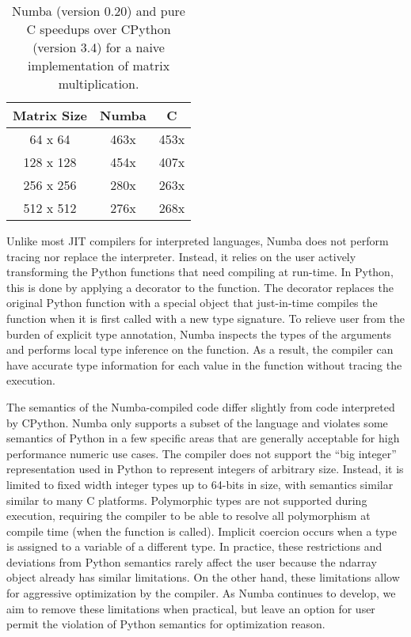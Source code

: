 \documentclass{acm_proc_article-sp}
\begin{document}
\begin{table}
\centering
\label{table:speedup}
\caption{Numba (version 0.20) and pure C speedups over CPython (version 3.4) for a naive implementation of matrix multiplication.}
\begin{tabular}{|c|c|c|} \hline
\textbf{Matrix Size} & \textbf{Numba} & \textbf{C}\\ \hline
64 x 64 & 463x & 453x \\ \hline
128 x 128 & 454x & 407x \\ \hline
256 x 256 & 280x & 263x \\ \hline
512 x 512 & 276x & 268x \\ \hline
\end{tabular}
\end{table}



Unlike most JIT compilers for interpreted languages, Numba does not
perform tracing nor replace the interpreter.  Instead, it relies on
the user actively transforming the Python functions that need
compiling at run-time.  In Python, this is done by applying a decorator
to the function.  The decorator replaces the original Python function
with a special object that just-in-time compiles the function when it
is first called with a new type signature.  To relieve user from the
burden of explicit type annotation, Numba inspects the types of the
arguments and performs local type inference on the function.  As a
result, the compiler can have accurate type information for each value
in the function without tracing the execution.

The semantics of the Numba-compiled code differ slightly from code
interpreted by CPython. Numba only supports a subset of the language
and violates some semantics of Python in a few specific areas that are
generally acceptable for high performance numeric use cases.  The
compiler does not support the ``big integer'' representation used in
Python to represent integers of arbitrary size.  Instead, it is
limited to fixed width integer types up to 64-bits in size, with
semantics similar similar to many C platforms.  Polymorphic types are
not supported during execution, requiring the compiler to be able to
resolve all polymorphism at compile time (when the function is
called).  Implicit coercion occurs when a type is assigned to a
variable of a different type. In practice, these restrictions and
deviations from Python semantics rarely affect the user because the
ndarray object already has similar limitations. On the other hand,
these limitations allow for aggressive optimization by the compiler.
As Numba continues to develop, we aim to remove these limitations when
practical, but leave an option for user permit the violation of Python
semantics for optimization reason.
\end{document}
